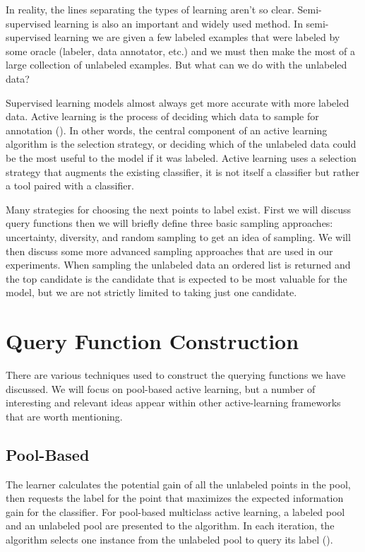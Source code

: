 In reality, the lines separating the types of learning aren't so clear. Semi-supervised learning is also an important and widely used method. In semi-supervised learning we are given a few labeled examples that were labeled by some oracle (labeler, data annotator, etc.) and we must then make the most of a large collection of unlabeled examples. But what can we do with the unlabeled data? 

Supervised learning models almost always get more accurate with more labeled data. Active learning is the process of deciding which data to sample for annotation (\cite{munro2021human}). In other words, the central component of an active learning algorithm is the selection strategy, or deciding which of the unlabeled data could be the most useful to the model if it was labeled. Active learning uses a selection strategy that augments the existing classifier, it is not itself a classifier but rather a tool paired with a classifier.

Many strategies for choosing the next points to label exist. First we will discuss query functions then we will briefly define three basic sampling approaches: uncertainty, diversity, and random sampling to get an idea of sampling. We will then discuss some more advanced sampling approaches that are used in our experiments. When sampling the unlabeled data an ordered list is returned and the top candidate is the candidate that is expected to be most valuable for the model, but we are not strictly limited to taking just one candidate.

\section{Query Function Construction}
There are various techniques used to construct the querying functions we have discussed. We will focus on pool-based active learning, but a number of interesting and relevant ideas appear within other active-learning frameworks that are worth mentioning.

\subsection{Pool-Based}
The learner calculates the potential gain of all the unlabeled points in the pool, then requests the label for the point that maximizes the expected information gain for the classifier. For pool-based multiclass active learning, a labeled pool and an unlabeled pool are presented to the algorithm. In each iteration, the algorithm selects one instance from the unlabeled pool to query its label (\cite{huang2016alce}).

